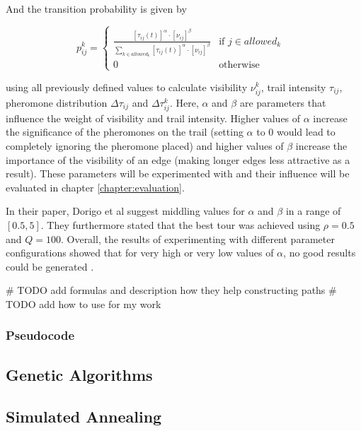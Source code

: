 And the transition probability is given by

\begin{equation}\label{eq:transitionProbability}
	p_{ij}^k = \begin{cases}
		\frac{[\tau_{ij}(t)]^{\alpha} \cdot [\nu_{ij}]^{\beta}}{\sum_{k \in allowed_k} [\tau_{ij}(t)]^{\alpha} \cdot [\nu_{ij}]^{\beta}} &\text{if $j \in allowed_k$ }\\
		0 &\text{otherwise}
	\end{cases}
\end{equation}

using all previously defined values to calculate visibility $\nu_{ij}^k$, trail intensity $\tau_{ij}$, pheromone distribution $\Delta\tau_{ij}$ and $\Delta\tau_{ij}^k$.
Here, $\alpha$ and $\beta$ are parameters that influence the weight of visibility and trail intensity.
Higher values of $\alpha$ increase the significance of the pheromones on the trail (setting $\alpha$ to 0 would lead to completely ignoring the pheromone placed) and higher values of $\beta$ increase the importance of the visibility of an edge (making longer edges less attractive as a result)\cite{dorigo_ant_1996}.
These parameters will be experimented with and their influence will be evaluated in chapter \ref{chapter:evaluation}.

In their paper, Dorigo et al suggest middling values for $\alpha$ and $\beta$ in a range of $[0.5,5]$.
They furthermore stated that the best tour was achieved using $\rho = 0.5$ and $Q=100$.
Overall, the results of experimenting with different parameter configurations showed that for very high or very low values of $\alpha$, no good results could be generated \cite{dorigo_ant_1996}.



\# TODO add formulas and description how they help constructing paths
\# TODO add how to use for my work


\subsubsection{Pseudocode}
\label{subsubsec:antPseudocode}


\subsection{Genetic Algorithms}
\label{subsec:geneticAlgorithmsBackground}

\subsection{Simulated Annealing}
\label{subsec:simulatedAnnealingBackground}

